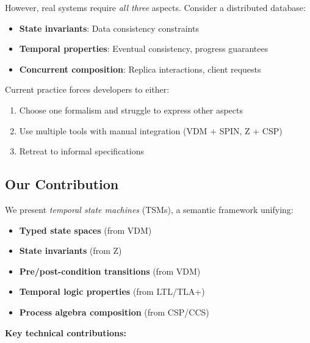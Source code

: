 \documentclass[conference]{IEEEtran}
\begin{document}
However, real systems require \textit{all three} aspects. Consider a distributed database:
\begin{itemize}
\item \textbf{State invariants}: Data consistency constraints
\item \textbf{Temporal properties}: Eventual consistency, progress guarantees
\item \textbf{Concurrent composition}: Replica interactions, client requests
\end{itemize}

Current practice forces developers to either:
\begin{enumerate}
\item Choose one formalism and struggle to express other aspects
\item Use multiple tools with manual integration (VDM + SPIN, Z + CSP)
\item Retreat to informal specifications
\end{enumerate}

\subsection{Our Contribution}

We present \textit{temporal state machines} (TSMs), a semantic framework unifying:
\begin{itemize}
\item \textbf{Typed state spaces} (from VDM)
\item \textbf{State invariants} (from Z)
\item \textbf{Pre/post-condition transitions} (from VDM)
\item \textbf{Temporal logic properties} (from LTL/TLA+)
\item \textbf{Process algebra composition} (from CSP/CCS)
\end{itemize}

\textbf{Key technical contributions:}
\end{document}
